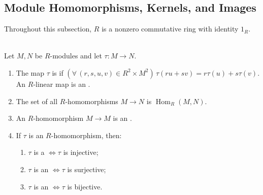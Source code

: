 \subsection{Module Homomorphisms, Kernels, and Images}

Throughout this subsection, $R$ is a nonzero commutative ring with identity $1_R$.

\begin{definition} \label{def:module-homomorphism} \\
Let $M,N$ be $R$-modules and let $\tau:M\to N$.
\begin{enumerate}[label=(\roman*)]
\setlength{\itemsep}{0pt}
\item The map $\tau$ is  if $(\forall\,(r,s,u,v)\in R^2\times M^2)\,\tau(ru+sv)=r\tau(u)+s\tau(v)$. An $R$-linear map is an .
\item The set of all $R$-homomorphisms $M\to N$ is $\operatorname{Hom}_R(M,N)$.
\item An $R$-homomorphism $M\to M$ is an .
\item If $\tau$ is an $R$-homomorphism, then:
\begin{enumerate}[label=(\alph*)]
\setlength{\itemsep}{0pt}
\item $\tau$ is a  $\Longleftrightarrow\tau$ is injective;
\item $\tau$ is an  $\Longleftrightarrow\tau$ is surjective;
\item $\tau$ is an  $\Longleftrightarrow\tau$ is bijective.
\end{enumerate}
\end{enumerate}
\end{definition}

